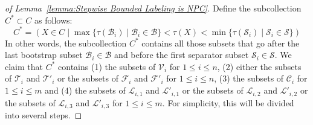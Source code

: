 \documentclass[a4paper,10pt]{llncs}
\begin{document}
\begin{proof}[of Lemma~\ref{lemma:Stepwise Bounded Labeling is NPC}]
  Define the subcollection $C^* \subset C$ as follows:
  $$
  C^* = (X \in C \mid \max \{\tau(\mathcal{B}_i) \mid \mathcal{B}_i \in
  \mathcal{B}\} < \tau(X) < \min \{\tau(\mathcal{S}_i) \mid
  \mathcal{S}_i \in \mathcal{S}\}) 
  $$
  In other words, the subcollection $C^*$ contains all those subsets
  that go after the last bootstrap subset $\mathcal{B}_i \in
  \mathcal{B}$ and before the first separator subset $\mathcal{S}_i \in
  \mathcal{S}$. We claim that $C^*$ contains (1) the subsets of
  $\mathcal{V}_i$ for $1 \leq i \leq n$, (2) either the subsets of
  $\mathcal{T}_i$ and $\mathcal{T}'_i$ or the subsets of $\mathcal{F}_i$
  and $\mathcal{F}'_i$ for $1 \leq i \leq n$, (3) the subsets of
  $\mathcal{C}_i$ for $1 \leq i \leq m$ and (4) the subsets of
  $\mathcal{L}_{i,1}$ and $\mathcal{L}'_{i,1}$ or the subsets of
  $\mathcal{L}_{i,2}$ and $\mathcal{L}'_{i,2}$ or the subsets of
  $\mathcal{L}_{i,3}$ and $\mathcal{L}'_{i,3}$ for $1 \leq i \leq
  m$. For simplicity, this will be divided into several steps. 


\end{proof}
\end{document}
